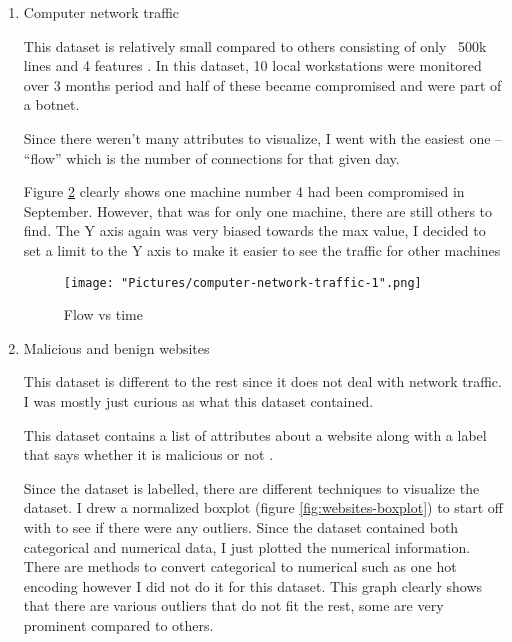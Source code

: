 \documentclass[11pt]{article}
\begin{document}
\begin{enumerate}
\begin{figure}[h!]
   \texttt{[image: "Pictures/gt-pie".png]}
   \caption{Frequency of protocols}
   \label{fig:gt-pie}
\end{figure}

  Finally, I drew a pie chart (figure \ref{fig:gt-pie}) to show what type of protocol were being used the most. This was to see what kind of network data was being passed around. Some protocols are also more vulnerable than others. 

  \item{Computer network traffic }

  This dataset is relatively small compared to others consisting of only ~500k lines and 4 features \cite{bg-dataset-net-traffic}. In this dataset, 10 local workstations were monitored over 3 months period and half of these became compromised and were part of a botnet. 

  Since there weren’t many attributes to visualize, I went with the easiest one – “flow” which is the number of connections for that given day. 

  Figure \ref{fig:com-net-flow} clearly shows one machine number 4 had been compromised in September. However, that was for only one machine, there are still others to find. The Y axis again was very biased towards the max value, I decided to set a limit to the Y axis to make it easier to see the traffic for other machines

\begin{figure}[h!]
   \texttt{[image: "Pictures/computer-network-traffic-1".png]}
   \caption{Flow vs time}
   \label{fig:com-net-flow}
\end{figure}

  \item{Malicious and benign websites}

  This dataset is different to the rest since it does not deal with network traffic. I was mostly just curious as what this dataset contained.
  
  This dataset contains a list of attributes about a website along with a label that says whether it is malicious or not \cite{bg-dataset-websites}. 

  Since the dataset is labelled, there are different techniques to visualize the dataset. I drew a normalized boxplot (figure \ref{fig:websites-boxplot}) to start off with to see if there were any outliers. Since the dataset contained both categorical and numerical data, I just plotted the numerical information. There are methods to convert categorical to numerical such as one hot encoding however I did not do it for this dataset. This graph clearly shows that there are various outliers that do not fit the rest, some are very prominent compared to others.


\end{enumerate}
\end{document}
